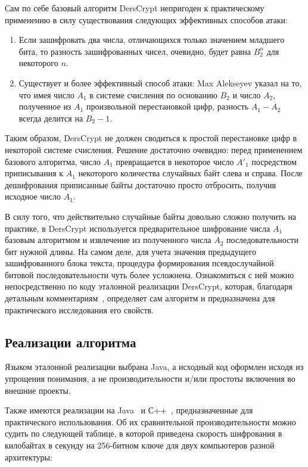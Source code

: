 \documentclass[10pt, a5paper]{article}
\begin{document}
Сам по себе базовый алгоритм DersCrypt непригоден к практическому применению в силу существования следующих эффективных способов атаки:

\begin{enumerate}
  \item Если зашифровать два числа, отличающихся только значением младшего бита, то разность зашифрованных чисел, очевидно, будет равна $B^{n}_{2}$ для некоторого $n$.
  \item Существует и более эффективный способ атаки: Max Alekseyev указал на то, что имея число $A_{1}$ в системе счисления по основанию $B_{2}$ и число $A_{2}$, полученное из $A_{1}$ произвольной перестановкой цифр, разность $A_{1} - A_{2}$ всегда делится на $B_{2} - {1}$.
\end{enumerate}

Таким образом, DersCrypt не должен сводиться к простой перестановке цифр в некоторой системе счисления. Решение достаточно очевидно: перед применением базового алгоритма, число $A_{1}$ превращается в некоторое число $A'_{1}$ посредством приписывания к $A_{1}$ некоторого количества случайных байт слева и справа. После дешифрования приписанные байты достаточно просто отбросить, получив исходное число $A_{1}$.

В силу того, что действительно случайные байты довольно сложно получить на практике, в DersCrypt используется предварительное шифрование числа $A_{1}$ базовым алгоритмом и извлечение из полученного числа $A_{2}$ последовательности бит нужной длины. На самом деле, для учета значения предыдущего зашифрованного блока текста, процедура формирования псевдослучайной битовой последовательности чуть более усложнена. Ознакомиться с ней можно непосредственно по коду эталонной реализации DersCrypt, которая, благодаря детальным комментариям~\cite{Derevyago3}, определяет сам алгоритм и предназначена для практического исследования его свойств.

\subsection*{Реализации алгоритма}

Языком эталонной реализации выбрана Java, а исходный код оформлен исходя из упрощения понимания, а не производительности и/или простоты включения во внешние проекты.

Также имеются реализации на Java~\cite{Derevyago4} и С++~\cite{Derevyago5}, предназначенные для практического использования. Об их сравнительной производительности можно судить по следующей таблице, в которой приведена скорость шифрования в килобайтах в секунду на 256-битном ключе для двух компьютеров разной архитектуры:
\end{document}
